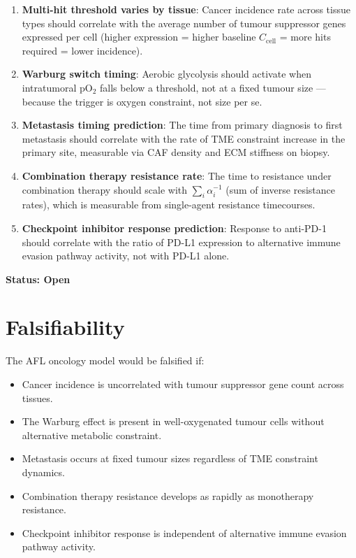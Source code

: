 \documentclass[12pt,a4paper]{article}
\begin{document}
\begin{enumerate}
    \item \textbf{Multi-hit threshold varies by tissue}: Cancer incidence rate across tissue types should correlate with the average number of tumour suppressor genes expressed per cell (higher expression = higher baseline $C_{\mathrm{cell}}$ = more hits required = lower incidence).
    \item \textbf{Warburg switch timing}: Aerobic glycolysis should activate when intratumoral $\mathrm{pO_2}$ falls below a threshold, not at a fixed tumour size --- because the trigger is oxygen constraint, not size per se.
    \item \textbf{Metastasis timing prediction}: The time from primary diagnosis to first metastasis should correlate with the rate of TME constraint increase in the primary site, measurable via CAF density and ECM stiffness on biopsy.
    \item \textbf{Combination therapy resistance rate}: The time to resistance under combination therapy should scale with $\sum_i \alpha_i^{-1}$ (sum of inverse resistance rates), which is measurable from single-agent resistance timecourses.
    \item \textbf{Checkpoint inhibitor response prediction}: Response to anti-PD-1 should correlate with the ratio of PD-L1 expression to alternative immune evasion pathway activity, not with PD-L1 alone.
\end{enumerate}

\textbf{Status: Open}

\section{Falsifiability}

The AFL oncology model would be falsified if:
\begin{itemize}
    \item Cancer incidence is uncorrelated with tumour suppressor gene count across tissues.
    \item The Warburg effect is present in well-oxygenated tumour cells without alternative metabolic constraint.
    \item Metastasis occurs at fixed tumour sizes regardless of TME constraint dynamics.
    \item Combination therapy resistance develops as rapidly as monotherapy resistance.
    \item Checkpoint inhibitor response is independent of alternative immune evasion pathway activity.
\end{itemize}
\end{document}

